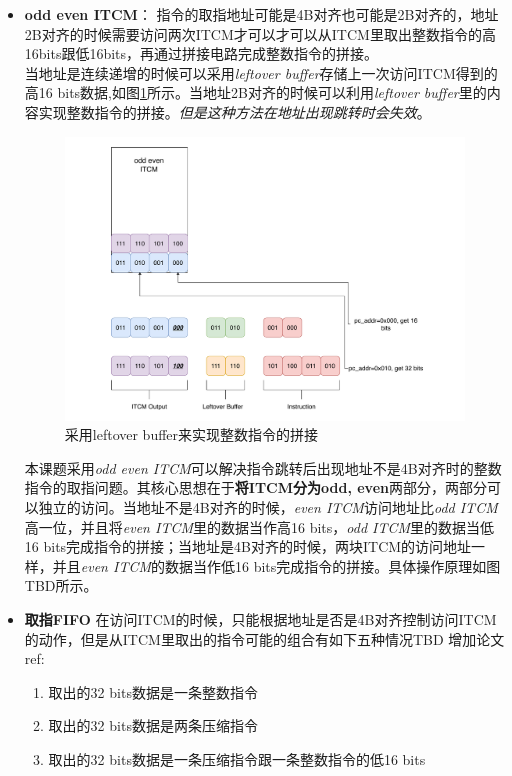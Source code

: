 \documentclass[a4paper, 12pt]{article}
\begin{document}
\begin{itemize}
  \item \textbf{odd even ITCM}：
    指令的取指地址可能是4B对齐也可能是2B对齐的，地址2B对齐的时候需要访问两次ITCM才可以才可以从ITCM里取出整数指令的高16bits跟低16bits，再通过拼接电路完成整数指令的拼接。\\ 
    当地址是连续递增的时候可以采用\textit{leftover buffer}存储上一次访问ITCM得到的高16 bits数据,如图\ref{fig:if_leftover_buffer}所示。当地址2B对齐的时候可以利用\textit{leftover buffer}里的内容实现整数指令的拼接。\textit{但是这种方法在地址出现跳转时会失效}。
    \begin{figure}[ht]
      \centering
      \includegraphics[width=0.8\linewidth]{./images/if_leftover_buffer.pdf}
      \caption{采用leftover buffer来实现整数指令的拼接}
      \label{fig:if_leftover_buffer}
    \end{figure}
    本课题采用\textit{odd even ITCM}可以解决指令跳转后出现地址不是4B对齐时的整数指令的取指问题。其核心思想在于\textbf{将ITCM分为odd, even}两部分，两部分可以独立的访问。当地址不是4B对齐的时候，\textit{even ITCM}访问地址比\textit{odd ITCM}高一位，并且将\textit{even ITCM}里的数据当作高16 bits，\textit{odd ITCM}里的数据当低16 bits完成指令的拼接；当地址是4B对齐的时候，两块ITCM的访问地址一样，并且\textit{even ITCM}的数据当作低16 bits完成指令的拼接。具体操作原理如图TBD所示。
  \item \textbf{取指FIFO}
    在访问ITCM的时候，只能根据地址是否是4B对齐控制访问ITCM的动作，但是从ITCM里取出的指令可能的组合有如下五种情况TBD 增加论文ref:
    \begin{enumerate}
      \item 取出的32 bits数据是一条整数指令
      \item 取出的32 bits数据是两条压缩指令
      \item 取出的32 bits数据是一条压缩指令跟一条整数指令的低16 bits

\end{enumerate}
\end{itemize}
\end{document}
